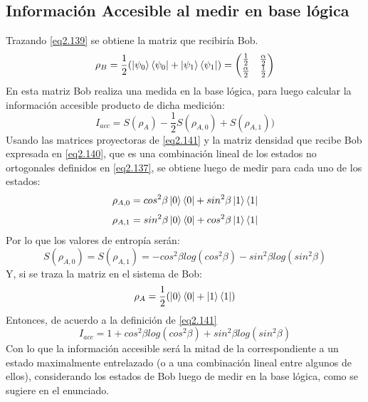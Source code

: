 \documentclass{book}
\begin{document}
\subsection{Información Accesible al medir en base lógica}
Trazando \ref{eq2.139} se obtiene la matriz que recibiría Bob.
\begin{equation}\label{eq2.140} \rho_B=\frac{1}{2}(\ket{\psi_0}\bra{\psi_0}+\ket{\psi_1}\bra{\psi_1}) =\begin{pmatrix} \frac{1}{2} & \frac{\alpha}{2} \\ \frac{\alpha}{2} & \frac{1}{2} \end{pmatrix}\end{equation}
En esta matriz Bob realiza una medida en la base lógica, para luego calcular la información accesible producto de dicha medición:
\begin{equation}\label{eq2.141}I_{acc}=S(\rho_A)-\frac{1}{2}S(\rho_{A,0})+S(\rho_{A,1}))\end{equation}
Usando las matrices proyectoras de \ref{eq2.141} y la matriz densidad que recibe Bob expresada en \ref{eq2.140}, que es una combinación lineal de los estados no ortogonales definidos en \ref{eq2.137}, se obtiene luego de medir para cada uno de los estados:
\begin{equation}\label{eq2.142}\rho_{A,0}=cos^2 \beta \ket{0}\bra{0}+sin^2\beta\ket{1}\bra{1}\end{equation}
\begin{equation}\label{eq2.143}\rho_{A,1}=sin^2 \beta\ket{0}\bra{0}+cos^2\beta\ket{1}\bra{1}\end{equation}
Por lo que los valores de entropía serán:
\begin{equation}\label{eq2.144} S(\rho_{A,0})=S(\rho_{A,1})=-cos^2\beta log(cos^2\beta)-sin^2\beta log(sin^2\beta)\end{equation}
Y, si se traza la matriz en el sistema de Bob:
\begin{equation}\label{eq2.145}\rho_A= \frac{1}{2}(\ket{0}\bra{0}+\ket{1}\bra{1})\end{equation}
Entonces, de acuerdo a la definición
de \ref{eq2.141}\begin{equation}\label{eq2.146}I_{acc}=1+cos^2\beta log(cos^2\beta)+sin^2\beta log(sin^2\beta)\end{equation}
Con lo que la información accesible será la mitad de la correspondiente a un estado maximalmente entrelazado (o a una combinación lineal entre algunos de ellos), considerando los estados de Bob luego de medir en la base lógica, como se sugiere en el enunciado.
\end{document}
